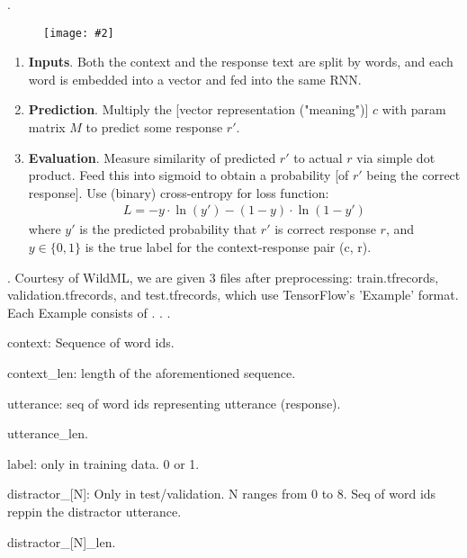 \documentclass[11pt]{article}
\newcommand\myfig[2][0.3\textwidth]{\begin{figure}[h!]\centering\texttt{[image: \#2]}\end{figure}}
\newcommand\myspace[1][]{\vspace{#1\bigskipamount}}
\newcommand\p{\Needspace{10\baselineskip} \noindent}
\begin{document}
\myspace
\p {}. 

\myfig{DualLSTM.png}

\begin{enumerate}
	\item \textbf{Inputs}. Both the context and the response text are split by words, and each word is embedded into a vector and fed into the same RNN.
	\item \textbf{Prediction}. Multiply the [vector representation ("meaning")] $c$ with param matrix $M$ to predict some response $r'$.
	\item \textbf{Evaluation}. Measure similarity of predicted $r'$ to actual $r$ via simple dot product. Feed this into sigmoid to obtain a probability [of $r'$ being the correct response]. Use (binary) cross-entropy for loss function:
	\begin{align}
	L = -y \cdot \ln(y') - (1 - y) \cdot \ln(1 - y')
	\end{align}
	where $y'$ is the predicted probability that $r'$ is correct response $r$, and $y \in \{0, 1\}$ is the true label for the context-response pair (c, r). 
\end{enumerate}



\myspace
\p {}. Courtesy of WildML, we are given 3 files after preprocessing: train.tfrecords, validation.tfrecords, and test.tfrecords, which use TensorFlow's 'Example' format. Each Example consists of . . . 
\begin{compactitem}
	\item context: Sequence of word ids. 
	\item context\_len: length of the aforementioned sequence.
	\item utterance: seq of word ids representing utterance (response). 
	\item utterance\_len.
	\item label: only in training data. 0 or 1.
	\item distractor\_[N]: Only in test/validation. N ranges from 0 to 8. Seq of word ids reppin the distractor utterance.
	\item distractor\_[N]\_len. 
\end{compactitem}








\end{document}
